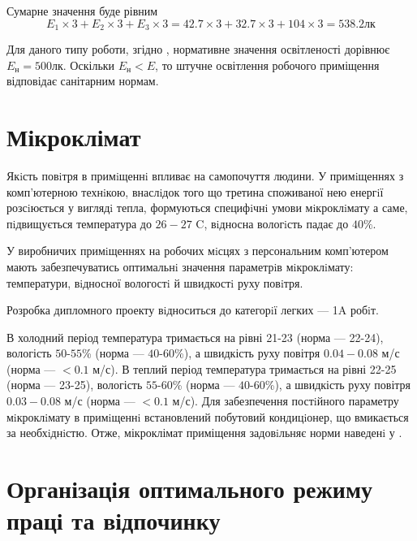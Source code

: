 Сумарне значення буде рівним
\begin{equation*}
  E_1 \times 3 + E_2 \times 3 + E_3 \times 3
  = 42.7 \times 3 + 32.7 \times 3 + 104 \times 3
  = 538.2 \text{лк}
\end{equation*}

Для даного типу роботи, згідно \cite{DBN}, нормативне значення освітленості
дорівнює $E_{\text{н}} = 500$лк. 
Оскільки $E_{\text{н}} < E$, то штучне освітлення робочого приміщення
відповідає санітарним нормам.

\section{Мікроклімат}

Якiсть повiтря в примiщеннi впливає на самопочуття людини.
У примiщеннях з комп’ютерною технiкою, внаслiдок того що третина споживаної нею
енергiї розсiюється у виглядi тепла, формуються специфiчнi умови мiкроклiмату
а саме, пiдвищується температура до $26-27$ C,
вiдносна вологiсть падає до $40\%$.

У виробничих примiщеннях на робочих мiсцях з персональним комп’ютером мають
забезпечуватись оптимальнi значення параметрiв мiкроклiмату: температури,
вiдносної вологостi й швидкостi руху повiтря. \cite{DSanPiN}

Розробка дипломного проекту вiдноситься до категорiї легких --- 1A робiт.

В холодний період температура тримається на рівні 21-23 (норма --- 22-24),
вологість $50$-$55$\% (норма --- $40$-$60$\%), а швидкість руху повітря
$0.04-0.08$ м/с (норма --- $<0.1$ м/с).
В теплий період температура тримається на рівні 22-25 (норма --- 23-25),
вологість $55$-$60$\% (норма --- $40$-$60$\%), а швидкість руху повітря
$0.03-0.08$ м/с (норма --- $<0.1$ м/с).
Для забезпечення постiйного параметру мiкроклiмату в примiщеннi встановлений
побутовий кондицiонер, що вмикається за необхiднiстю.
Отже, мікроклімат приміщення задовiльняє норми наведенi у \cite{DSN}.

\section{Організація оптимального режиму праці та відпочинку}

